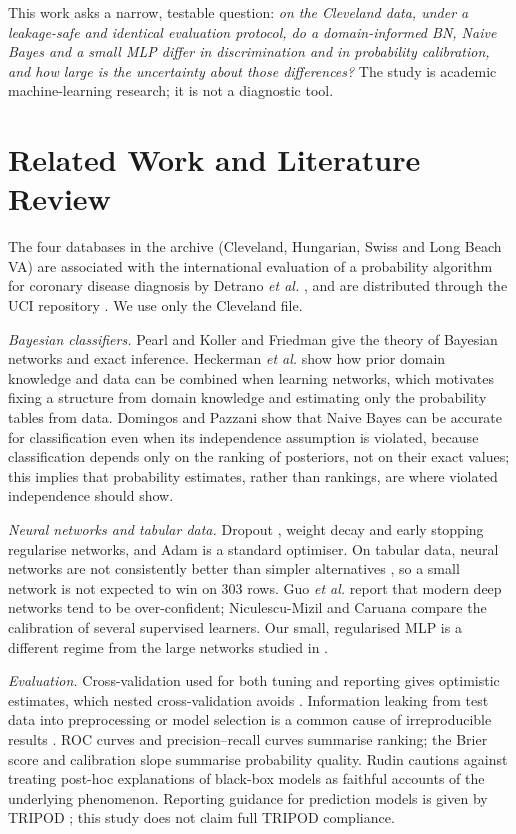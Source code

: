 \documentclass[conference]{IEEEtran}
\begin{document}
This work asks a narrow, testable question: \emph{on the Cleveland data, under a leakage-safe and identical evaluation protocol, do a domain-informed BN, Naive Bayes and a small MLP differ in discrimination and in probability calibration, and how large is the uncertainty about those differences?} The study is academic machine-learning research; it is not a diagnostic tool.

\section{Related Work and Literature Review}
The four databases in the archive (Cleveland, Hungarian, Swiss and Long Beach VA) are associated with the international evaluation of a probability algorithm for coronary disease diagnosis by Detrano \emph{et al.} \cite{detrano1989}, and are distributed through the UCI repository \cite{uciheart}. We use only the Cleveland file.

\emph{Bayesian classifiers.} Pearl \cite{pearl1988} and Koller and Friedman \cite{koller2009} give the theory of Bayesian networks and exact inference. Heckerman \emph{et al.} \cite{heckerman1995} show how prior domain knowledge and data can be combined when learning networks, which motivates fixing a structure from domain knowledge and estimating only the probability tables from data. Domingos and Pazzani \cite{domingos1997} show that Naive Bayes can be accurate for classification even when its independence assumption is violated, because classification depends only on the ranking of posteriors, not on their exact values; this implies that probability estimates, rather than rankings, are where violated independence should show.

\emph{Neural networks and tabular data.} Dropout \cite{srivastava2014}, weight decay and early stopping regularise networks, and Adam \cite{kingma2015} is a standard optimiser. On tabular data, neural networks are not consistently better than simpler alternatives \cite{shwartz2022,grinsztajn2022}, so a small network is not expected to win on 303 rows. Guo \emph{et al.} \cite{guo2017} report that modern deep networks tend to be over-confident; Niculescu-Mizil and Caruana \cite{niculescu2005} compare the calibration of several supervised learners. Our small, regularised MLP is a different regime from the large networks studied in \cite{guo2017}.

\emph{Evaluation.} Cross-validation used for both tuning and reporting gives optimistic estimates, which nested cross-validation avoids \cite{varma2006,cawley2010}. Information leaking from test data into preprocessing or model selection is a common cause of irreproducible results \cite{kapoor2023}. ROC curves \cite{fawcett2006,hanley1982} and precision--recall curves \cite{davis2006} summarise ranking; the Brier score \cite{brier1950} and calibration slope \cite{steyerberg2010,vancalster2019} summarise probability quality. Rudin \cite{rudin2019} cautions against treating post-hoc explanations of black-box models as faithful accounts of the underlying phenomenon. Reporting guidance for prediction models is given by TRIPOD \cite{collins2015}; this study does not claim full TRIPOD compliance.
\end{document}
